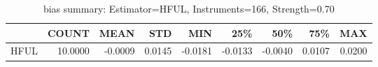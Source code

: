 \begin{table}[ht]
\centering
\caption{bias summary: Estimator=HFUL, Instruments=166, Strength=0.70}
\begin{tabular}{lrrrrrrrr}
\toprule
 & COUNT & MEAN & STD & MIN & 25\% & 50\% & 75\% & MAX \\
\midrule
HFUL & 10.0000 & -0.0009 & 0.0145 & -0.0181 & -0.0133 & -0.0040 & 0.0107 & 0.0200 \\
\bottomrule
\end{tabular}
\end{table}
